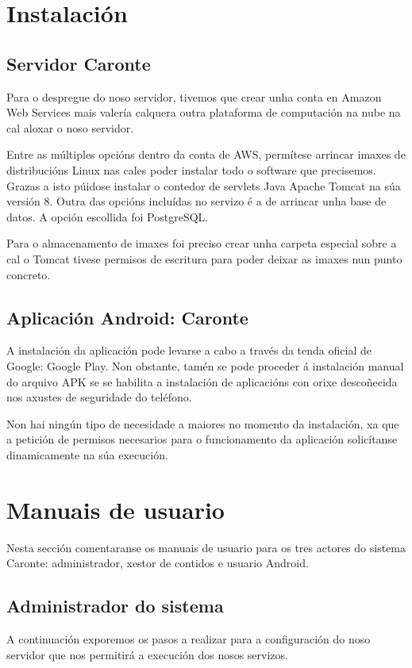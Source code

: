 \section{Instalación}

\subsection{Servidor Caronte}
Para o despregue do noso servidor, tivemos que crear unha conta en Amazon Web Services mais valería calquera outra plataforma de computación na nube na cal aloxar o noso servidor.

Entre as múltiples opcións dentro da conta de AWS, permítese arrincar imaxes de distribucións Linux nas cales poder instalar todo o software que precisemos. Grazas a isto púidose instalar o contedor de servlets Java Apache Tomcat na súa versión 8. Outra das opcións incluídas no servizo é a de arrincar unha base de datos. A opción escollida foi PostgreSQL.

Para o almacenamento de imaxes foi preciso crear unha carpeta especial sobre a cal o Tomcat tivese permisos de escritura para poder deixar as imaxes nun punto concreto.

\subsection{Aplicación Android: Caronte}
A instalación da aplicación pode levarse a cabo a través da tenda oficial de Google: Google Play. Non obstante, tamén se pode proceder á instalación manual do arquivo APK se se habilita a instalación de aplicacións con orixe descoñecida nos axustes de seguridade do teléfono.

Non hai ningún tipo de necesidade a maiores no momento da instalación, xa que a petición de permisos necesarios para o funcionamento da aplicación solicítanse dinamicamente na súa execución.

\section{Manuais de usuario}
Nesta sección comentaranse os manuais de usuario para os tres actores do sistema Caronte:
administrador, xestor de contidos e usuario Android.

\subsection{Administrador do sistema}
A continuación exporemos os pasos a realizar para a configuración do noso servidor que nos permitirá a execución dos nosos servizos.

